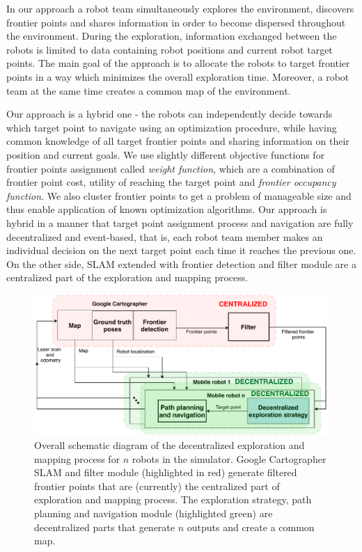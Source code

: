 In our approach a robot team simultaneously explores the environment, discovers frontier points and shares information in order to become dispersed throughout the environment. During the exploration, information exchanged between the robots is limited to data containing robot positions and current robot target points. The main goal of the approach is to allocate the robots to target frontier points in a way which minimizes the overall exploration time. Moreover, a robot team at the same time creates a common map of the environment. 

Our approach is a hybrid one - the robots can independently decide towards which target point to navigate using an optimization procedure, while having common knowledge of all target frontier points and sharing information on their position and current goals. We use slightly different objective functions for frontier points assignment called \textit{weight function}, which are a combination of frontier point cost, utility of reaching the target point and \textit{frontier occupancy function}. We also cluster frontier points to get a problem of manageable size and thus enable application of known optimization algorithms. 
Our approach is hybrid in a manner that target point assignment process and navigation are fully decentralized and event-based, that is, each robot team member makes an individual decision on the next target point each time it reaches the previous one. On the other side, SLAM extended with frontier detection and filter module are a centralized part of the exploration and mapping process.

\begin{figure}[t!]
	\centering\includegraphics[width=1.0\columnwidth]{./pictures/diagram_exploration.pdf}
	\caption{Overall schematic diagram of the decentralized exploration and mapping process for $n$ robots in the simulator. Google Cartographer SLAM and filter module (highlighted in red) generate filtered frontier points that are (currently) the centralized part of exploration and mapping process. The exploration strategy, path planning and navigation module (highlighted green) are decentralized parts that generate $n$ outputs and create a common map.}
	\label{fig:exploration-strategy}
\end{figure}


